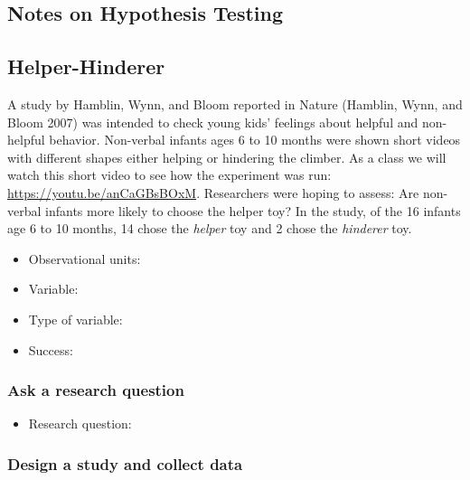 \documentclass[
]{report}
\providecommand{\tightlist}{%
  \setlength{\itemsep}{0pt}\setlength{\parskip}{0pt}}
\begin{document}
\newpage

\subsection*{Notes on Hypothesis Testing}\label{notes-on-hypothesis-testing}

\vspace{4in}

\subsection{Helper-Hinderer}\label{helper-hinderer}

A study by Hamblin, Wynn, and Bloom reported in Nature (Hamblin, Wynn, and Bloom 2007) was intended to check young kids' feelings about helpful and non-helpful behavior. Non-verbal infants ages 6 to 10 months were shown short videos with different shapes either helping or hindering the climber. As a class we will watch this short video to see how the experiment was run: \url{https://youtu.be/anCaGBsBOxM}. Researchers were hoping to assess: Are non-verbal infants more likely to choose the helper toy? In the study, of the 16 infants age 6 to 10 months, 14 chose the \emph{helper} toy and 2 chose the \emph{hinderer} toy.

\begin{itemize}
\item
  Observational units:
\item
  Variable:
\item
  Type of variable:
\item
  Success:
\end{itemize}

\subsubsection*{Ask a research question}\label{ask-a-research-question}

\begin{itemize}
\tightlist
\item
  Research question:
\end{itemize}

\vspace{0.2in}

\subsubsection*{Design a study and collect data}\label{design-a-study-and-collect-data}
\end{document}
